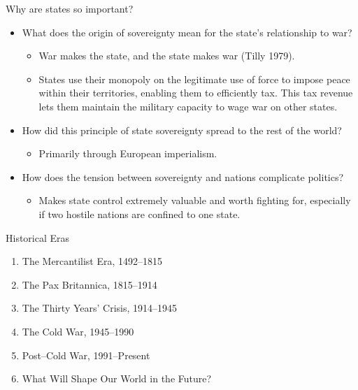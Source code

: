 \documentclass{beamer}
\begin{document}
\begin{frame}{\LARGE Why are states so important?}
	\begin{itemize}
	     \item What does the origin of sovereignty mean for the state's relationship to war? \pause 
	    \begin{itemize}
	        \item War makes the state, and the state makes war (Tilly 1979). \pause
	        \item States use their monopoly on the legitimate use of force to impose peace within their territories, enabling them to efficiently tax. This tax revenue lets them maintain the military capacity to wage war on other states.
	    \end{itemize}
	    \item How did this principle of state sovereignty spread to the rest of the world? \pause
	    \begin{itemize}
	        \item Primarily through European imperialism. \pause
	    \end{itemize}
	    \item How does the tension between sovereignty and nations complicate politics? \pause
	    \begin{itemize}
	        \item Makes state control extremely valuable and worth fighting for, especially if two hostile nations are confined to one state.
	    \end{itemize}
	\end{itemize}
\end{frame}

\begin{frame}{\LARGE Historical Eras}
\begin{enumerate}
	\item The Mercantilist Era, 1492–1815
	\item The Pax Britannica, 1815–1914
	\item The Thirty Years’ Crisis, 1914–1945
	\item The Cold War, 1945–1990
	\item Post–Cold War, 1991–Present
	\item What Will Shape Our World in the Future?	
\end{enumerate}
\end{frame}
\end{document}
